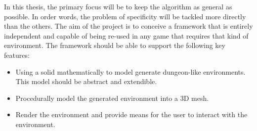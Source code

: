 In this thesis, the primary focus will be to keep the algorithm as general as possible. In order words, the problem of specificity will be tackled more directly than the others. The aim of the project is to conceive a framework that is entirely independent and capable of being re-used in any game that requires that kind of environment. The framework should be able to support the following key features:
\begin{itemize}
\item Using a solid mathematically to model generate dungeon-like environments. This model should be abstract and extendible.
\item Procedurally model the generated environment into a 3D mesh.
\item Render the environment and provide means for the user to interact with the environment.
\end{itemize}